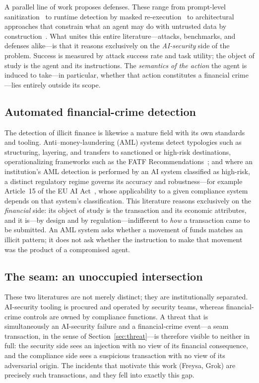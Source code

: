 \documentclass[10pt,twocolumn]{article}
\begin{document}
A parallel line of work proposes defenses. These range from prompt-level
sanitization~\cite{commandsans} to runtime detection by masked
re-execution~\cite{melon} to architectural approaches that constrain what
an agent may do with untrusted data by construction~\cite{camel}. What unites
this entire literature---attacks, benchmarks, and defenses alike---is that it
reasons exclusively on the \emph{AI-security} side of the problem. Success is
measured by attack success rate and task utility; the object of study is the
agent and its instructions. The \emph{semantics of the action} the agent is
induced to take---in particular, whether that action constitutes a financial
crime---lies entirely outside its scope.

\subsection{Automated financial-crime detection}

The detection of illicit finance is likewise a mature field with its own
standards and tooling. Anti--money-laundering (AML) systems detect typologies
such as structuring, layering, and transfers to sanctioned or high-risk
destinations, operationalizing frameworks such as the FATF
Recommendations~\cite{fatf}; and where an institution's AML detection is
performed by an AI system classified as high-risk, a distinct regulatory regime
governs its accuracy and robustness---for example Article~15 of the EU AI
Act~\cite{euaiact}, whose applicability to a given compliance system depends on
that system's classification. This literature reasons
exclusively on the \emph{financial} side: its object of study is the
transaction and its economic attributes, and it is---by design and by
regulation---indifferent to \emph{how} a transaction came to be submitted. An
AML system asks whether a movement of funds matches an illicit pattern; it does
not ask whether the instruction to make that movement was the product of a
compromised agent.

\subsection{The seam: an unoccupied intersection}

These two literatures are not merely distinct; they are institutionally
separated. AI-security tooling is procured and operated by security teams,
whereas financial-crime controls are owned by compliance functions. A threat
that is simultaneously an AI-security failure and a financial-crime event---a
seam transaction, in the sense of Section~\ref{sec:threat}---is therefore visible to neither
in full: the security side sees an injection with no view of its financial
consequence, and the compliance side sees a suspicious transaction with no view
of its adversarial origin. The incidents that motivate this work (Freysa, Grok)
are precisely such transactions, and they fell into exactly this gap.
\end{document}
